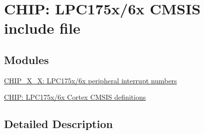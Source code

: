\hypertarget{group__CMSIS__175X__6X}{\section{C\-H\-I\-P\-: L\-P\-C175x/6x C\-M\-S\-I\-S include file}
\label{group__CMSIS__175X__6X}
}
\subsection*{Modules}
\begin{DoxyCompactItemize}
\item 
\hyperlink{group__CMSIS__175X__6X__IRQ}{C\-H\-I\-P\-\_\-X\-\_\-X\-: L\-P\-C175x/6x peripheral interrupt numbers}
\item 
\hyperlink{group__CMSIS__175X__6X__COMMON}{C\-H\-I\-P\-: L\-P\-C175x/6x Cortex C\-M\-S\-I\-S definitions}
\end{DoxyCompactItemize}


\subsection{Detailed Description}
